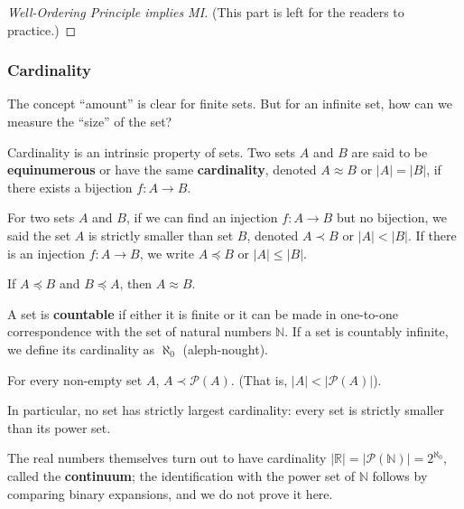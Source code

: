 \begin{proof}[Well-Ordering Principle implies MI]
(This part is left for the readers to practice.)
\end{proof}

\subsubsection*{Cardinality}
The concept “amount” is clear for finite sets. But for an infinite set, how can we measure the “size” of the set?
\begin{definition}
Cardinality is an intrinsic property of sets. Two sets $A$ and $B$ are said to be \textbf{equinumerous} or have the same \textbf{cardinality}, denoted $A \approx B$ or $|A|=|B|$, if there exists a bijection $f: A \to B$.
\end{definition}

\begin{definition}
For two sets $A$ and $B$, if we can find an injection $f: A \to B$ but no bijection, we said the set $A$ is strictly smaller than set $B$, denoted $A \prec B$ or $|A| < |B|$. If there is an injection $f: A \to B$, we write $A \preceq B$ or $|A| \le |B|$.
\end{definition}

\begin{theorem}
If $A \preceq B$ and $B \preceq A$, then $A \approx B$.
\end{theorem}

\begin{definition}
A set is \textbf{countable} if either it is finite or it can be made in one-to-one correspondence with the set of natural numbers $\mathbb{N}$. If a set is countably infinite, we define its cardinality as $\aleph_0$ (aleph-nought).
\end{definition}

\begin{theorem}
For every non-empty set $A$, $A \prec \mathcal{P}(A)$. (That is, $|A| < |\mathcal{P}(A)|$).
\end{theorem}
In particular, no set has strictly largest cardinality: every set is strictly smaller than its power set.

The real numbers themselves turn out to have cardinality $|\mathbb{R}| = |\mathcal{P}(\mathbb{N})| = 2^{\aleph_0}$, called the \textbf{continuum}; the identification with the power set of $\mathbb{N}$ follows by comparing binary expansions, and we do not prove it here.

